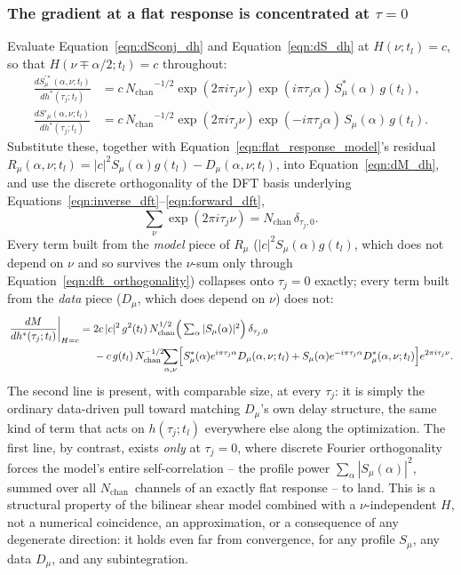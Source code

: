 \documentclass[manuscript]{aastex631}
\newcommand{\Nchan}{\ensuremath{N_\mathrm{chan}}}
\newcommand{\Eqn}[1]{Equation~\ref{eqn:#1}}
\begin{document}
\subsubsection*{The gradient at a flat response is concentrated at $\tau=0$}

Evaluate \Eqn{dSconj_dh} and \Eqn{dS_dh} at $H(\nu;t_l)=c$, so that $H(\nu\mp\alpha/2;t_l)=c$
throughout:
\begin{align}
\frac{dS_\mu^{\prime *}(\alpha,\nu;t_l)}{dh^*(\tau_j;t_l)}
&= c\,\Nchan^{-1/2}\exp(2\pi i\tau_j\nu)\exp(i\pi\tau_j\alpha)\,S_\mu^*(\alpha)\,g(t_l), \\
\frac{dS'_\mu(\alpha,\nu;t_l)}{dh^*(\tau_j;t_l)}
&= c\,\Nchan^{-1/2}\exp(2\pi i\tau_j\nu)\exp(-i\pi\tau_j\alpha)\,S_\mu(\alpha)\,g(t_l).
\end{align}
Substitute these, together with \Eqn{flat_response_model}'s residual $R_\mu(\alpha,\nu;t_l) =
|c|^2 S_\mu(\alpha) g(t_l) - D_\mu(\alpha,\nu;t_l)$, into \Eqn{dM_dh}, and use the discrete
orthogonality of the DFT basis underlying Equations~\ref{eqn:inverse_dft}--\ref{eqn:forward_dft},
\begin{equation}
\sum_\nu \exp(2\pi i \tau_j \nu) = \Nchan\,\delta_{\tau_j,0}.
\label{eqn:dft_orthogonality}
\end{equation}
Every term built from the \emph{model} piece of $R_\mu$ ($|c|^2 S_\mu(\alpha) g(t_l)$, which does
not depend on $\nu$ and so survives the $\nu$-sum only through \Eqn{dft_orthogonality}) collapses
onto $\tau_j=0$ exactly; every term built from the \emph{data} piece ($D_\mu$, which does depend on
$\nu$) does not:
\begin{align}
\left.\frac{dM}{dh^*(\tau_j;t_l)}\right|_{H=c}
= \;& 2c\,|c|^2\,g^2(t_l)\,\Nchan^{1/2}\Big(\textstyle\sum_\alpha|S_\mu(\alpha)|^2\Big)\,\delta_{\tau_j,0} \notag \\
  & - c\,g(t_l)\,\Nchan^{-1/2}\!\!\sum_{\alpha,\nu}\!\Big[S_\mu^*(\alpha)e^{i\pi\tau_j\alpha}D_\mu(\alpha,\nu;t_l)
    + S_\mu(\alpha)e^{-i\pi\tau_j\alpha}D_\mu^*(\alpha,\nu;t_l)\Big] e^{2\pi i \tau_j\nu}.
\label{eqn:flat_response_gradient}
\end{align}
The second line is present, with comparable size, at every $\tau_j$: it is simply the ordinary
data-driven pull toward matching $D_\mu$'s own delay structure, the same kind of term that acts on
$h(\tau_j;t_l)$ everywhere else along the optimization. The first line, by contrast, exists
\emph{only} at $\tau_j=0$, where discrete Fourier orthogonality forces the model's entire
self-correlation -- the profile power $\sum_\alpha|S_\mu(\alpha)|^2$, summed over all \Nchan\
channels of an exactly flat response -- to land. This is a structural property of the bilinear
shear model combined with a $\nu$-independent $H$, not a numerical coincidence, an approximation,
or a consequence of any degenerate direction: it holds even far from convergence, for any profile
$S_\mu$, any data $D_\mu$, and any subintegration.
\end{document}
